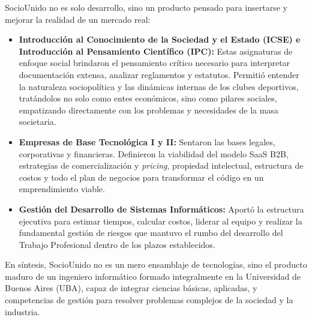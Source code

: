 SocioUnido no es solo desarrollo, sino un producto pensado para insertarse y mejorar la realidad de un mercado real:
\begin{itemize}
\item \textbf{Introducción al Conocimiento de la Sociedad y el Estado (ICSE) e Introducción al Pensamiento Científico (IPC):} Estas asignaturas de enfoque social brindaron el pensamiento crítico necesario para interpretar documentación extensa, analizar reglamentos y estatutos. Permitió entender la naturaleza sociopolítica y las dinámicas internas de los clubes deportivos, tratándolos no solo como entes económicos, sino como pilares sociales, empatizando directamente con los problemas y necesidades de la masa societaria.
\item \textbf{Empresas de Base Tecnológica I y II:} Sentaron las bases legales, corporativas y financieras. Definieron la viabilidad del modelo SaaS B2B, estrategias de comercialización y \textit{pricing}, propiedad intelectual, estructura de costos y todo el plan de negocios para transformar el código en un emprendimiento viable.
\item \textbf{Gestión del Desarrollo de Sistemas Informáticos:} Aportó la estructura ejecutiva para estimar tiempos, calcular costos, liderar al equipo y realizar la fundamental gestión de riesgos que mantuvo el rumbo del desarrollo del Trabajo Profesional dentro de los plazos establecidos.
\end{itemize}

En síntesis, SocioUnido no es un mero ensamblaje de tecnologías, sino el producto maduro de un ingeniero informático formado integralmente en la Universidad de Buenos Aires (UBA), capaz de integrar ciencias básicas, aplicadas, y competencias de gestión para resolver problemas complejos de la sociedad y la industria.
